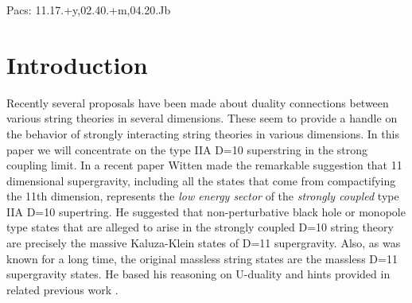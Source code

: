 Pacs: {11.17.+y,02.40.+m,04.20.Jb}


\section{Introduction}

Recently several proposals have been made about duality connections between
various string theories in several dimensions. These seem to provide a
handle on the behavior of strongly interacting string theories in various
dimensions. In this paper we will concentrate on the type IIA D=10
superstring in the strong coupling limit. In a recent paper Witten \cite
{witten} made the remarkable suggestion that 11 dimensional supergravity,
including all the states that come from compactifying the 11th dimension,
represents the {\it low energy sector} of the {\it strongly coupled} type
IIA D=10 supertring. He suggested that non-perturbative black hole or
monopole type states that are alleged to arise in the strongly coupled D=10
string theory are precisely the massive Kaluza-Klein states of D=11
supergravity. Also, as was known for a long time, the original massless
string states are the massless D=11 supergravity states. He based his
reasoning on U-duality and hints provided in related previous work \cite
{hulltowns}.

